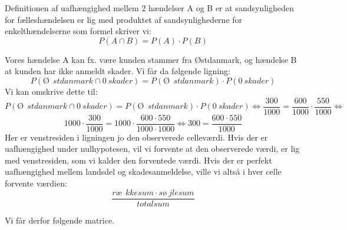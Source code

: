 \documentclass[]{book}
\begin{document}
Definitionen af uafhængighed mellem 2 hændelser A og B er at sandsynligheden for fælleshændelsen er lig med produktet af sandsynlighederne for enkelthændelserne som formel skriver vi:
\[P(A\cap B)=P(A)\cdot P(B)\]

Vores hændelse A kan fx. være kunden stammer fra Østdanmark, og hændelse B at kunden har ikke anmeldt skader. Vi får da følgende ligning:
\[P(Ø\ \ stdanmark\cap 0\ skader)=P(Ø\ \ stdanmark)\cdot P(0\ skader)\]
Vi kan omskrive dette til:
\[P(Ø\ \ stdanmark\cap0\ skader)=P(Ø\ \ stdanmark)\cdot P(0\ skader)\Leftrightarrow \frac{300}{1000}=\frac{600}{1000}\cdot \frac{550}{1000} \Leftrightarrow \]\[1000\cdot\frac{300}{1000}=1000\cdot \frac{600\cdot550}{1000\cdot1000} \Leftrightarrow 300= \frac{600\cdot550}{1000}\]
Her er venstresiden i ligningen jo den observerede celleværdi. Hvis der er uafhængighed under nulhypotesen, vil vi forvente at den observerede værdi, er lig med venstresiden, som vi kalder den forventede værdi. Hvis der er perfekt uafhængighed mellem landsdel og skadesanmeldelse, ville vi altså i hver celle forvente værdien:
\[\frac{ræ\ \ kkesum\cdot sø\ jlesum}{totalsum}\]

Vi får derfor følgende matrice.
\end{document}
